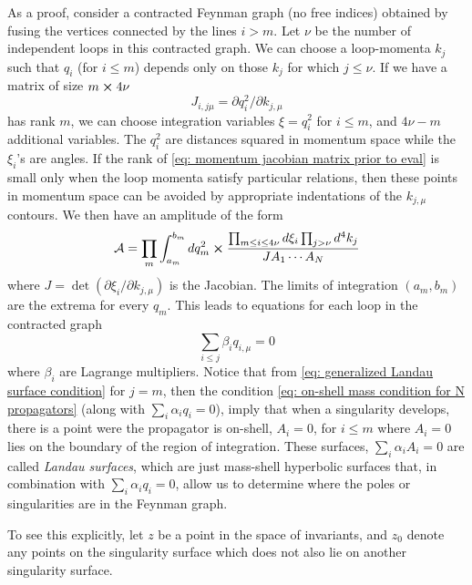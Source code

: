 \documentclass[a4paper,11pt]{article}
\begin{document}
As a proof, consider a contracted Feynman graph (no free indices) obtained by fusing the vertices connected by the lines $i>m$. Let $\nu$ be the number of independent loops in this contracted graph. We can choose a loop-momenta $k_j$ such that $q_i$ (for $i\leq m$) depends only on those $k_j$ for which $j\leq \nu$. If we have a matrix of size $m\cross 4\nu$
\begin{equation}
    J_{i,j\mu} = \partial q_i^2/\partial k_{j,\mu}\label{eq: momentum jacobian matrix prior to eval}
\end{equation}
has rank $m$, we can choose integration variables $\xi = q_i^2$ for $i\leq m$, and $4\nu -m$ additional variables. The $q_i^2$ are distances squared in momentum space while the $\xi_i$'s are angles. If the rank of \eqref{eq: momentum jacobian matrix prior to eval} is small only when the loop momenta satisfy particular relations, then these points in momentum space can be avoided by appropriate indentations of the $k_{j,\mu}$ contours. We then have an amplitude of the form
\begin{equation}
    \mathcal{A} = \prod_m\int_{a_m}^{b_m}dq_m^2\cross \frac{\prod_{m\leq i\leq 4\nu}d\xi_i\prod_{j>\nu}d^4k_j}{JA_1\cdots A_N}\label{eq: deformed integral contour over loop momenta}
\end{equation}
where $J = \det(\partial\xi_i/\partial k_{j,\mu})$ is the Jacobian. The limits of integration $(a_m,b_m)$ are the extrema for every $q_m$. This leads to equations for each loop in the contracted graph
\begin{equation}
    \sum_{i\leq j}\beta_i q_{i,\mu} = 0\label{eq: generalized Landau surface condition}
\end{equation}
where $\beta_i$ are Lagrange multipliers. Notice that from \eqref{eq: generalized Landau surface condition} for $j=m$, then the condition \eqref{eq: on-shell mass condition for N propagators} (along with $\sum_i\alpha_iq_i = 0$), imply that when a singularity develops, there is a point were the propagator is on-shell, $A_i = 0$, for $i\leq m$ where $A_i = 0$ lies on the boundary of the region of integration. These surfaces, $\sum_i\alpha_iA_i = 0$ are called \textit{Landau surfaces}, which are just mass-shell hyperbolic surfaces that, in combination with $\sum_i\alpha_iq_i = 0$, allow us to determine where the poles or singularities are in the Feynman graph.

To see this explicitly, let $z$ be a point in the space of invariants, and $z_0$ denote any points on the singularity surface which does not also lie on another singularity surface. 
\end{document}
